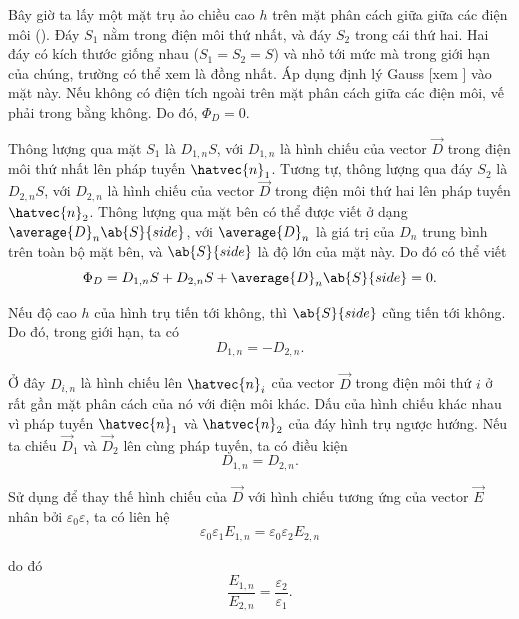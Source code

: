 Bây giờ ta lấy một mặt trụ ảo chiều cao $h$ trên mặt phân cách giữa giữa các điện môi (). Đáy $S_1$ nằm trong điện môi thứ nhất, và đáy $S_2$ trong cái thứ hai. Hai đáy có kích thước giống nhau ($S_1=S_2=S$) và nhỏ tới mức mà trong giới hạn của chúng, trường có thể xem là đồng nhất. Áp dụng định lý Gauss [xem ] vào mặt này. Nếu không có điện tích ngoài trên mặt phân cách giữa các điện môi, vế phải trong  bằng không. Do đó, $\Phi_D=0$.

Thông lượng qua mặt $S_1$ là $D_{1,n}S$, với $D_{1,n}$ là hình chiếu của vector $\vec{D}$ trong điện môi thứ nhất lên pháp tuyến $\hatvec{n}_1$. Tương tự, thông lượng qua đáy $S_2$ là $D_{2,n}S$, với $D_{2,n}$ là hình chiếu của vector $\vec{D}$ trong điện môi thứ hai lên pháp tuyến $\hatvec{n}_2$. Thông lượng qua
mặt bên có thể được viết ở dạng $\average{D}_n\ab{S}{side}$, với $\average{D}_n$ là giá trị của $D_n$ trung bình trên toàn bộ mặt bên, và $\ab{S}{side}$ là độ lớn của mặt này. Do đó có thể viết
\begin{equation}\label{eq:2_46}
    \Phi_D = D_{1,n} S + D_{2,n} S + \average{D}_n\ab{S}{side} = 0.
\end{equation}

\noindent
Nếu độ cao $h$ của hình trụ tiến tới không, thì $\ab{S}{side}$ cũng tiến tới không. Do đó, trong giới hạn, ta có
\begin{equation*}
    D_{1,n} = - D_{2,n}.
\end{equation*}

\noindent
Ở đây $D_{i,n}$ là hình chiếu lên $\hatvec{n}_i$ của vector $\vec{D}$ trong điện môi thứ $i$ ở rất gần mặt phân cách của nó với điện môi khác. Dấu của hình chiếu khác nhau vì pháp tuyến $\hatvec{n}_1$ và $\hatvec{n}_2$ của đáy hình trụ ngược hướng. Nếu ta chiếu $\vec{D}_1$ và $\vec{D}_2$ lên cùng pháp tuyến, ta có điều kiện
\begin{equation}\label{eq:2_47}
    D_{1,n} = D_{2,n}.
\end{equation}

Sử dụng  để thay thế hình chiếu của $\vec{D}$ với hình chiếu tương ứng của vector $\vec{E}$ nhân bởi $\varepsilon_0\varepsilon$, ta có liên hệ
\begin{equation*}
    \varepsilon_0 \varepsilon_1 E_{1,n} = \varepsilon_0 \varepsilon_2 E_{2,n}
\end{equation*}

\noindent
do đó
\begin{equation}\label{eq:2_48}
    \frac{E_{1,n}}{E_{2,n}} = \frac{\varepsilon_2}{\varepsilon_1}.
\end{equation}

